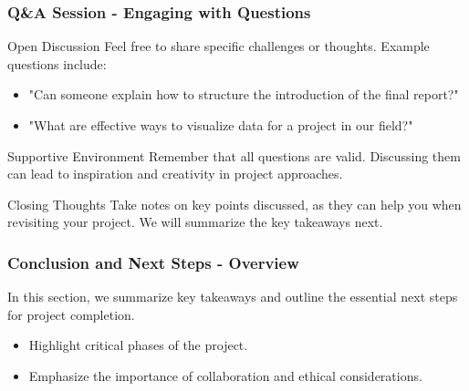 \documentclass[aspectratio=169]{beamer}
\begin{document}
\begin{frame}[fragile]
    \frametitle{Q\&A Session - Engaging with Questions}
    \begin{block}{Open Discussion}
        Feel free to share specific challenges or thoughts. Example questions include:
        \begin{itemize}
            \item "Can someone explain how to structure the introduction of the final report?"
            \item "What are effective ways to visualize data for a project in our field?"
        \end{itemize}
    \end{block}
    
    \begin{block}{Supportive Environment}
        Remember that all questions are valid. Discussing them can lead to inspiration and creativity in project approaches.
    \end{block}
    
    \begin{block}{Closing Thoughts}
        Take notes on key points discussed, as they can help you when revisiting your project. We will summarize the key takeaways next.
    \end{block}
\end{frame}

\begin{frame}[fragile]
    \frametitle{Conclusion and Next Steps - Overview}
    In this section, we summarize key takeaways and outline the essential next steps for project completion.
    \begin{itemize}
        \item Highlight critical phases of the project.
        \item Emphasize the importance of collaboration and ethical considerations.
    \end{itemize}
\end{frame}
\end{document}
